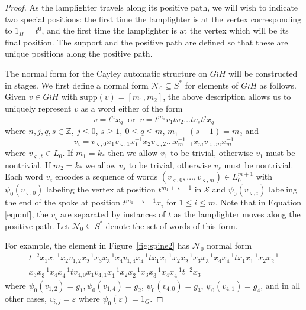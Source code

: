 \documentclass[11pt]{amsart}
\newcommand{\cC}{\varsigma}
\theoremstyle{definition}
\newcommand\Z{\mathbb Z}
\newcommand\support{\mathrm{supp}}
\newcommand\h{x}
\renewcommand{\geq}{\geqslant} \renewcommand{\leq}{\leqslant} \renewcommand{\ge}{\geqslant} \renewcommand{\le}{\leqslant}
\begin{document}
\begin{proof}
As the lamplighter travels along its positive path, we  will wish to  indicate two special positions: the first time the lamplighter is at the vertex corresponding to $1_H=t^0$, and the first time the lamplighter is at the vertex which will be its final position.
The support and the positive path are defined so that these are unique positions along the positive path.

The normal form for the Cayley automatic structure on $G \wr H$ will be constructed in stages.
We first define a normal form $\mathcal N_0\subseteq S^*$  for elements of $G\wr H$ as follows.  Given $v \in G\wr H$ with $\support(v) = [m_1,m_2]$, the above description allows us to uniquely represent $v$ as a word either of the form
\begin{equation}
\label{eqn:nf}
v=t^nx_q\ \text{  or  }\
v=t^{m_1}v_1tv_2\dots tv_st^jx_q
\end{equation}
where $n,j,q, s \in\Z, \ j\leq 0$,
$s\geq 1,  \ 0\leq q\leq m$,  $m_1+(s-1)=m_2$
and
\begin{equation}
\label{eqn:nf2}
v_\cC=v_{\cC,0}\h_1v_{\cC,1}\h_1^{-1}\h_2v_{\cC,2}\dots \h_{m-1}^{-1}\h_mv_{\cC,m}\h_m^{-1}
\end{equation}
where $v_{\cC,t} \in L_0$.  If $m_1 = k_*$ then we allow $v_1$ to be trivial, otherwise $v_1$ must be nontrivial.
If $m_2 = k_*$ we allow $v_s$ to be trivial, otherwise $v_s$ must be nontrivial.
Each word $v_\cC$ encodes a sequence of words $(v_{\cC,0},\dots, v_{\cC,m})\in  L_0^{m+1}$ with $\psi_0(v_{\cC, 0})$ labeling the vertex at position $t^{m_1+\cC-1}$ in $\mathcal S$
and $\psi_0(v_{\cC, i})$ labeling the end of the spoke at position  $t^{m_1+\cC-1}x_i$ for $1 \leq i \leq m$.
Note that in Equation  \eqref{eqn:nf}, the $v_\cC$ are separated by instances of $t$ as the lamplighter moves along the positive path.
Let ${\mathcal N}_0\subseteq S^*$ denote the set of words of this form.


For example,
the element in
 Figure~\ref{fig:spine2}
 has $\mathcal N_0$ normal form
    \begin{equation*}
   \begin{split}
t^{-2}x_1x_1^{-1}x_2v_{1,2}x_2^{-1}x_3x_3^{-1}x_4v_{1,4}x_4^{-1}
 tx_1x_1^{-1}x_2x_2^{-1}x_3x_3^{-1}x_4x_4^{-1}
 tx_1x_1^{-1}x_2x_2^{-1} \\
 x_3x_3^{-1}x_4x_4^{-1}
  tv_{4,0}x_1v_{4,1}x_1^{-1}x_2x_2^{-1}x_3x_3^{-1}x_4x_4^{-1}
 t^{-2}x_3
   \end{split}
   \end{equation*}  where $\psi_0(v_{1,2})=g_1, \psi_0(v_{1,4})=g_2$, $\psi_0(v_{4,0})=g_3$, $\psi_0(v_{4,1})=g_4$, and  in all other cases, $v_{i,j}=\varepsilon$ where $\psi_0(\varepsilon)=1_G$.






\end{proof}
\end{document}
